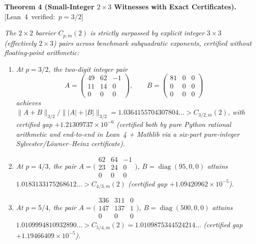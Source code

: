 \documentclass[10pt,letterpaper]{article}
\newcommand{\leanbadge}[1]{\mbox{\sffamily\scriptsize\color{leanborder}[#1]}}
\newcommand{\diag}{\operatorname{diag}}
\begin{document}
\begin{tcolorbox}[mathbox]
\textbf{Theorem 4 (Small-Integer $2\times 3$ Witnesses with Exact Certificates).}\hfill\leanbadge{Lean~4 verified: $p=3/2$}\par\vspace{1.5pt}
\emph{The $2\times 2$ barrier $C_{p,m}(2)$ is strictly surpassed by explicit integer $3\times 3$ (effectively $2\times 3$) pairs across benchmark subquadratic exponents, certified without floating-point arithmetic:}
\begin{enumerate}[leftmargin=1.6em,itemsep=2.5pt,topsep=3pt]
  \item \emph{At $p = 3/2$, the two-digit integer pair}
  \[
    A = \begin{pmatrix} 49 & 62 & -1 \\ 11 & 14 & 0 \\ 0 & 0 & 0 \end{pmatrix}, \qquad
    B = \begin{pmatrix} 81 & 0 & 0 \\ 0 & 0 & 0 \\ 0 & 0 & 0 \end{pmatrix}
  \]
  \emph{achieves $\|A+B\|_{3/2} / \||A|+|B|\|_{3/2} = 1.0364155704307804\dots > C_{3/2,m}(2)$, with certified gap $+1.21309737\times 10^{-6}$ (certified both by pure Python rational arithmetic and end-to-end in Lean~4 + Mathlib via a six-part pure-integer Sylvester/L\"owner--Heinz certificate).}
  \item \emph{At $p = 4/3$, the pair $A = \bigl(\begin{smallmatrix} 62 & 64 & -1 \\ 23 & 24 & 0 \\ 0 & 0 & 0 \end{smallmatrix}\bigr)$, $B = \diag(95, 0, 0)$ attains $1.0183133175268612\dots > C_{4/3,m}(2)$ (certified gap $+1.09420962\times 10^{-5}$).}
  \item \emph{At $p = 5/4$, the pair $A = \bigl(\begin{smallmatrix} 336 & 311 & 0 \\ 147 & 137 & 1 \\ 0 & 0 & 0 \end{smallmatrix}\bigr)$, $B = \diag(500, 0, 0)$ attains $1.0109994810932890\dots > C_{5/4,m}(2) = 1.0109875344524214\dots$ (certified gap $+1.19466409\times 10^{-5}$).}
\end{enumerate}
\end{tcolorbox}
\end{document}
